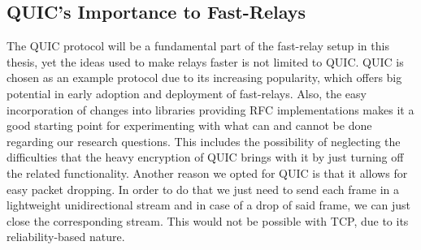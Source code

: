 \subsection{QUIC's Importance to Fast-Relays}
The QUIC protocol will be a fundamental part of the fast-relay setup in this thesis, yet the ideas used 
to make relays faster is not limited to QUIC\@.
QUIC is chosen as an example protocol due to its increasing popularity, which offers big potential 
in early adoption and deployment of fast-relays.
Also, the easy incorporation of changes into libraries providing RFC implementations makes it a good 
starting point for experimenting with what can and cannot be done regarding our research questions.
This includes the possibility of neglecting the difficulties that the heavy encryption of QUIC brings with 
it by just turning off the related functionality.
Another reason we opted for QUIC is that it allows for easy packet dropping.
In order to do that we just need to send each frame in a lightweight unidirectional stream and in 
case of a drop of said frame, we can just close the corresponding stream.
This would not be possible with TCP, due to its reliability-based nature.

